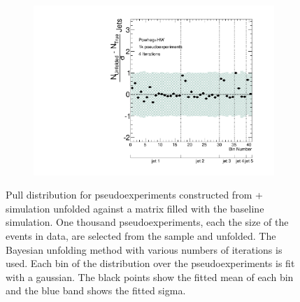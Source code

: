 \begin{figure}
\begin{subfigure}[]{0.5\textwidth}
\end{subfigure}
~
\begin{subfigure}[]{0.5\textwidth}
\includegraphics[width=\textwidth]{fig/Stress/105860atlfast/Pull4Iterations.pdf}
\end{subfigure}
\caption{Pull distribution for pseudoexperiments constructed from \newline \pow+\hw~ simulation unfolded against a matrix filled with the baseline simulation. One thousand pseudoexperiments, each the size of the events in data, are selected from the sample and unfolded. The Bayesian unfolding method with various numbers of iterations is used. Each bin of the distribution over the pseudoexperiments is fit with a gaussian. The black points show the fitted mean of each bin and the blue band shows the fitted sigma.}
\label{fig:powhwpull}
\end{figure}
\clearpage
